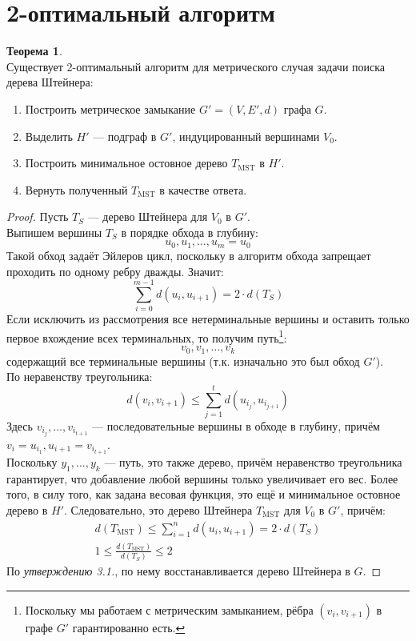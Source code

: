 \documentclass[11pt,a4paper]{report}
\def\le{\leqslant}
\theoremstyle{definition}
\theoremstyle{definition}
\newtheorem{theorem}{Теорема}[section]
\theoremstyle{definition}
\begin{document}
	\section{2-оптимальный алгоритм}
	\begin{theorem}$  $\\
		Существует 2-оптимальный алгоритм для метрического случая задачи поиска дерева Штейнера:
		\begin{enumerate}
			\item Построить метрическое замыкание $G' = (V, E', d)$ графа $G$.
			\item Выделить $H'$ — подграф в $G'$, индуцированный вершинами $V_0$. 
			\item Построить минимальное остовное дерево $T_{\mathrm{MST}}$ в $H'$.
			\item Вернуть полученный $T_{\mathrm{MST}} $ в качестве ответа.
		\end{enumerate}
	\end{theorem}
	\begin{proof}
		Пусть $T_{S}$ — дерево Штейнера для $V_0$ в $G'$.\\
		Выпишем вершины $T_{S}$ в порядке обхода в глубину:
		$$
			u_0, u_1, \ldots, u_m = u_0
		$$ 
		Такой обход задаёт Эйлеров цикл, поскольку в алгоритм обхода запрещает проходить по одному ребру дважды. Значит:
		$$ 
			\sum_{i=0}^{m-1} d(u_i, u_{i+1}) = 2 \cdot d(T_{S})
		$$
		Если исключить из рассмотрения все нетерминальные вершины и оставить только первое вхождение всех терминальных, то получим путь\footnote{Поскольку мы работаем с метрическим замыканием, рёбра $(v_{i}, v_{i+1})$ в графе $G'$ гарантированно есть.}:
		$$
			v_0, v_1, \ldots, v_k
		$$
		содержащий все терминальные вершины (т.к. изначально это был обход $G'$).\\ 
		По неравенству треугольника:
		$$
			d(v_i, v_{i+1}) \le \sum_{j=1}^{t} d(u_{i_j}, u_{i_{j+1}})
		$$
		Здесь $v_{i_{j}}, \ldots, v_{i_{t+1}}$ — последовательные вершины в обходе в глубину, причём $v_i = u_{i_{1}}, u_{i+1} = v_{i_{t+1}}$.\\
		Поскольку $y_1, \ldots, y_k$ — путь, это также дерево, причём неравенство треугольника гарантирует, что добавление любой вершины только увеличивает его вес. Более того, в силу того, как задана весовая функция, это ещё и минимальное остовное дерево в $H'$. Следовательно, это дерево Штейнера $T_{\mathrm{MST}}$ для $V_0$ в $G'$, причём:
		\begin{gather*}
			d(T_{\mathrm{MST}}) \le \sum_{i=1}^{n} d(u_i, u_{i+1}) = 2 \cdot d(T_{S})\\
			1 \le \frac{d(T_{\mathrm{MST}})}{d(T_{S})} \le 2
		\end{gather*}
		По \textit{утверждению 3.1.}, по нему восстанавливается дерево Штейнера в $G$.
	\end{proof}
\end{document}

